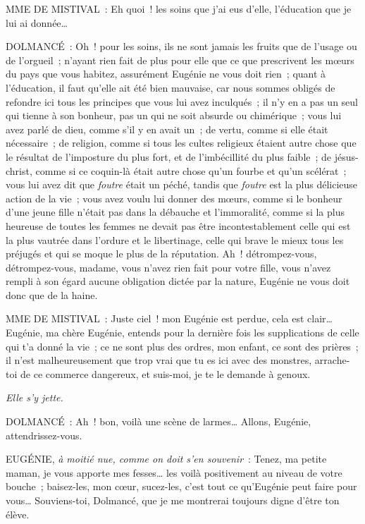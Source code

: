 \documentclass[french,twoside]{book} %
\begin{document}
MME DE MISTIVAL : Eh quoi ! les soins que j’ai eus d’elle, l’éducation que je lui ai donnée…\par
DOLMANCÉ : Oh ! pour les soins, ils ne sont jamais les fruits que de l’usage ou de l’orgueil ; n’ayant rien fait de plus pour elle que ce que prescrivent les mœurs du pays que vous habitez, assurément Eugénie ne vous doit rien ; quant à l’éducation, il faut qu’elle ait été bien mauvaise, car nous sommes obligés de refondre ici tous les principes que vous lui avez inculqués ; il n’y en a pas un seul qui tienne à son bonheur, pas un qui ne soit absurde ou chimérique ; vous lui avez parlé de dieu, comme s’il y en avait un ; de vertu, comme si elle était nécessaire ; de religion, comme si tous les cultes religieux étaient autre chose que le résultat de l’imposture du plus fort, et de l’imbécillité du plus faible ; de jésus-christ, comme si ce coquin-là était autre chose qu’un fourbe et qu’un scélérat ; vous lui avez dit que {\itshape foutre} était un péché, tandis que {\itshape foutre} est la plus délicieuse action de la vie ; vous avez voulu lui donner des mœurs, comme si le bonheur d’une jeune fille n’était pas dans la débauche et l’immoralité, comme si la plus heureuse de toutes les femmes ne devait pas être incontestablement celle qui est la plus vautrée dans l’ordure et le libertinage, celle qui brave le mieux tous les préjugés et qui se moque le plus de la réputation. Ah ! détrompez-vous, détrompez-vous, madame, vous n’avez rien fait pour votre fille, vous n’avez rempli à son égard aucune obligation dictée par la nature, Eugénie ne vous doit donc que de la haine.\par
MME DE MISTIVAL : Juste ciel ! mon Eugénie est perdue, cela est clair… Eugénie, ma chère Eugénie, entends pour la dernière fois les supplications de celle qui t’a donné la vie ; ce ne sont plus des ordres, mon enfant, ce sont des prières ; il n’est malheureusement que trop vrai que tu es ici avec des monstres, arrache-toi de ce commerce dangereux, et suis-moi, je te le demande à genoux.\par
{\itshape Elle s’y jette.}\par
DOLMANCÉ : Ah ! bon, voilà une scène de larmes… Allons, Eugénie, attendrissez-vous.\par
EUGÉNIE, {\itshape à moitié nue, comme on doit s’en souvenir} : Tenez, ma petite maman, je vous apporte mes fesses… les voilà positivement au niveau de votre bouche ; baisez-les, mon cœur, sucez-les, c’est tout ce qu’Eugénie peut faire pour vous… Souviens-toi, Dolmancé, que je me montrerai toujours digne d’être ton élève.\par
\end{document}
